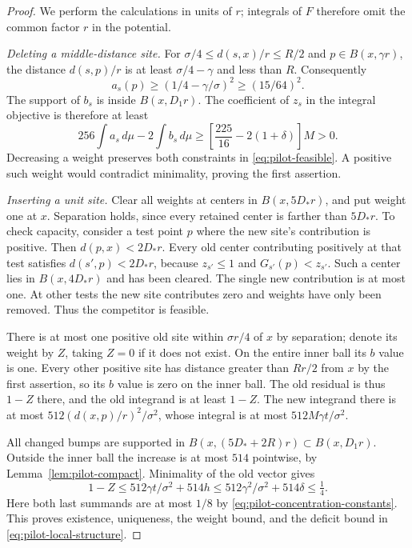 \begin{proof}
We perform the calculations in units of $r$; integrals of $F$ therefore
omit the common factor $r$ in the potential.

\emph{Deleting a middle-distance site.}
For $\sigma/4\le d(s,x)/r\le R/2$ and $p\in B(x,\gamma r)$,
the distance $d(s,p)/r$ is at least $\sigma/4-\gamma$ and less than $R$.
Consequently
\[
 a_s(p)\ge(1/4-\gamma/\sigma)^2\ge(15/64)^2.
\]
The support of $b_s$ is inside $B(x,D_1r)$.  The coefficient of $z_s$
in the integral objective is therefore at least
\[
 256\int a_s\,d\mu-2\int b_s\,d\mu
 \ge\left[\frac{225}{16}-2(1+\delta)\right]M>0.
\]
Decreasing a weight preserves both constraints in
\eqref{eq:pilot-feasible}.  A positive such weight would contradict
minimality, proving the first assertion.

\emph{Inserting a unit site.}
Clear all weights at centers in $B(x,5D_*r)$, and put weight one at $x$.
Separation holds, since every retained center is farther than $5D_*r$.
To check capacity, consider a test point $p$ where the new site's
contribution is positive.  Then $d(p,x)<2D_*r$.  Every old center
contributing positively at that test satisfies $d(s',p)<2D_*r$, because
$z_{s'}\le1$ and $G_{s'}(p)<z_{s'}$.  Such a center lies in
$B(x,4D_*r)$ and has been cleared.  The single new contribution is at
most one.  At other tests the new site contributes zero and weights have
only been removed.  Thus the competitor is feasible.

There is at most one positive old site within $\sigma r/4$ of $x$ by
separation; denote its weight by $Z$, taking $Z=0$ if it does not exist.
On the entire inner ball its $b$ value is one.  Every other positive
site has distance greater than $Rr/2$ from $x$ by the first assertion,
so its $b$ value is zero on the inner ball.  The old residual is thus
$1-Z$ there, and the old integrand is at least $1-Z$.  The new integrand
there is at most $512(d(x,p)/r)^2/\sigma^2$, whose integral is at most
$512M\gamma t/\sigma^2$.

All changed bumps are supported in
$B(x,(5D_*+2R)r)\subset B(x,D_1r)$.  Outside the inner ball the increase
is at most $514$ pointwise, by Lemma~\ref{lem:pilot-compact}.  Minimality
of the old vector gives
\begin{equation}
 1-Z\le512\gamma t/\sigma^2+514h
       \le512\gamma^2/\sigma^2+514\delta\le\tfrac14.
 \label{eq:pilot-deficit-proof}
\end{equation}
Here both last summands are at most $1/8$ by
\eqref{eq:pilot-concentration-constants}.  This proves existence,
uniqueness, the weight bound, and the deficit bound in
\eqref{eq:pilot-local-structure}.


\end{proof}

